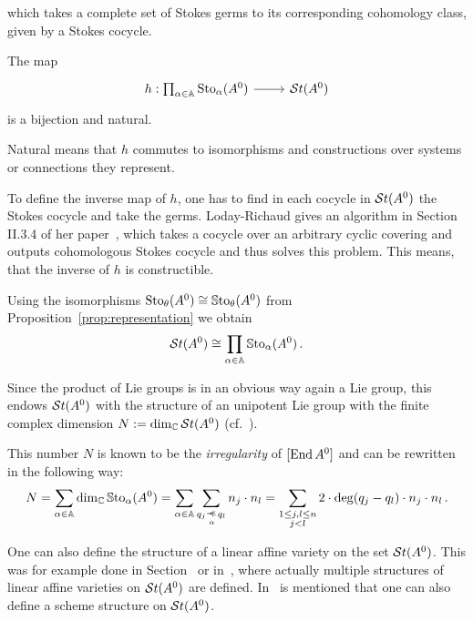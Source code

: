 which takes a complete set of Stokes germs to its corresponding cohomology
class, given by a Stokes cocycle.
\begin{center}
  \begin{minipage}[t]{0.8\textwidth}
    \begin{tthm}\label{thm:mainThm2}
      The map
      \[ \begin{tikzcd}
          h:\prod_{\alpha\in\A}\Sto_\alpha(A^0) \rar& \St(A^0)
      \end{tikzcd} \]
      is a bijection and natural.
      \begin{s-rem}
        Natural means that $h$ commutes to isomorphisms and constructions over
        systems or connections they represent.
      \end{s-rem}
    \end{tthm}
  \end{minipage}
\end{center}
To define the inverse map of $h$, one has to find in each cocycle in $\mathcal{S}{}t(A^0)$
the Stokes cocycle and take the germs. Loday-Richaud gives an algorithm in
Section II.3.4 of her paper~\cite{Loday1994}, which takes a cocycle over an
arbitrary cyclic covering and outputs cohomologous Stokes cocycle and thus
solves this problem. This means, that the inverse of $h$ is constructible.

\begin{cor}
  \BIGPROBLEM[remove?]
  Using the isomorphisms $\operatorname{Sto}_\theta(A^0)\cong\operatorname{\mathbb{S}to}_\theta(A^0)$ from
  Proposition~\ref{prop:representation} we obtain
  \[
    \mathcal{S}{}t(A^0)\cong\prod_{\alpha\in\mathbb{A}}\operatorname{\mathbb{S}to}_\alpha(A^0) \,.
  \]
\end{cor}
Since the product of Lie groups is in an obvious way again a Lie group, this
endows $\mathcal{S}{}t(A^0)$ with the structure of an unipotent Lie group with the
finite complex dimension $N:=\dim_\mathbb{C}\mathcal{S}{}t(A^0)$
(cf.~\cite[Sec.III.1]{Loday1994}).
\begin{rem}
  This number $N$ is known to be the \emph{irregularity} of $[\operatorname{End} A^0]$ and
  can be rewritten in the following way:
  \[
    N=\sum_{\alpha\in\A}\dim_\C\SSto_\alpha(A^0)
     =\sum_{\alpha\in\A}\sum_{q_j\myrel{\alpha}q_l}n_j\cdot n_l
     =\sum_{\substack{1\leq j,l\leq n\\j<l}}2\cdot\deg(q_j-q_l)\cdot
       n_j\cdot n_l \,.
  \]
\end{rem}

One can also define the structure of a linear affine variety on the set
$\mathcal{S}{}t(A^0)$. This was for example done in
Section~\cite[Sec.II.3]{babbitt1989local} or in~\cite[Sec.III.1]{Loday1994}, where
actually multiple structures of linear affine varieties on $\mathcal{S}{}t(A^0)$ are
defined. In~\cite[35ff]{Varadarajan96linearmeromorphic} is mentioned that one
can also define a scheme structure on $\mathcal{S}{}t(A^0)$.

